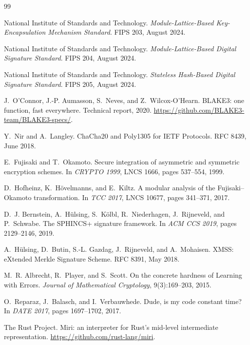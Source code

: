 \documentclass[runningheads]{llncs}
\begin{document}
\begin{thebibliography}{99}

National Institute of Standards and Technology.
\newblock \emph{Module-Lattice-Based Key-Encapsulation Mechanism
Standard}. FIPS 203, August 2024.

National Institute of Standards and Technology.
\newblock \emph{Module-Lattice-Based Digital Signature Standard}.
FIPS 204, August 2024.

National Institute of Standards and Technology.
\newblock \emph{Stateless Hash-Based Digital Signature Standard}.
FIPS 205, August 2024.

J.~O'Connor, J.-P. Aumasson, S.~Neves, and Z.~Wilcox-O'Hearn.
\newblock BLAKE3: one function, fast everywhere.
\newblock Technical report, 2020.
\newblock \url{https://github.com/BLAKE3-team/BLAKE3-specs/}.

Y.~Nir and A.~Langley.
\newblock ChaCha20 and Poly1305 for IETF Protocols.
\newblock RFC 8439, June 2018.

E.~Fujisaki and T.~Okamoto.
\newblock Secure integration of asymmetric and symmetric encryption
schemes.
\newblock In \emph{CRYPTO 1999}, LNCS 1666, pages 537--554, 1999.

D.~Hofheinz, K.~H\"ovelmanns, and E.~Kiltz.
\newblock A modular analysis of the Fujisaki--Okamoto transformation.
\newblock In \emph{TCC 2017}, LNCS 10677, pages 341--371, 2017.

D.~J. Bernstein, A.~H\"ulsing, S.~K\"olbl, R.~Niederhagen,
J.~Rijneveld, and P.~Schwabe.
\newblock The SPHINCS+ signature framework.
\newblock In \emph{ACM CCS 2019}, pages 2129--2146, 2019.

A.~H\"ulsing, D.~Butin, S.-L. Gazdag, J.~Rijneveld, and A.~Mohaisen.
\newblock XMSS: eXtended Merkle Signature Scheme.
\newblock RFC 8391, May 2018.

M.~R. Albrecht, R.~Player, and S.~Scott.
\newblock On the concrete hardness of Learning with Errors.
\newblock \emph{Journal of Mathematical Cryptology}, 9(3):169--203,
2015.

O.~Reparaz, J.~Balasch, and I.~Verbauwhede.
\newblock Dude, is my code constant time?
\newblock In \emph{DATE 2017}, pages 1697--1702, 2017.

The Rust Project.
\newblock Miri: an interpreter for Rust's mid-level intermediate
representation.
\newblock \url{https://github.com/rust-lang/miri}.

\end{thebibliography}
\end{document}
